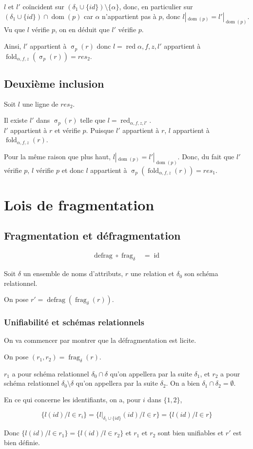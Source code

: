 \documentclass[french]{article}
\DeclareMathOperator{\sel}{\sigma}
\DeclareMathOperator{\frag}{frag}
\DeclareMathOperator{\defrag}{defrag}
\DeclareMathOperator{\id}{id}
\DeclareMathOperator{\dom}{dom}
\DeclareMathOperator{\redu}{red}
\newcommand{\selP}{\sel_p}
\newcommand{\fragDelta}{\frag_{\delta}}
\newcommand{\cip}{\cup \{id\}}
\newcommand{\fold}[3]{\operatorname{fold}_{#1, #2, #3}}
\newcommand{\foldAlphafz}{\fold{\alpha}{f}{z}}
\begin{document}
$l$ et $l'$ coïncident sur $(\delta_1 \cip) \setminus \{ \alpha \}$,
donc, en particulier sur $(\delta_1 \cip) \cap \dom(p)$ car
$\alpha$ n'appartient pas à $p$, donc $l|_{\dom(p)} = l'|_{\dom(p)}$.
Vu que $l$ vérifie $p$, on en déduit que $l'$ vérifie $p$.

Ainsi, $l'$ appartient à $\selP(r)$ donc
$l = \redu{\alpha, f, z, l'}$ appartient
à $\foldAlphafz(\selP(r)) = res_2$.

\subsection*{Deuxième inclusion}
Soit $l$ une ligne de $res_2$.

Il existe $l'$ dans $\selP(r)$ telle que
$l = \redu_{\alpha, f, z, l'}$. \\

$l'$ appartient à $r$ et vérifie $p$.
Puisque $l'$ appartient à $r$,
$l$ appartient à $\foldAlphafz(r)$.

Pour la même raison que plus haut, $l|_{\dom(p)} = l'|_{\dom(p)}$.
Donc, du fait que $l'$ vérifie $p$, $l$ vérifie $p$ et donc
$l$ appartient à $\selP(\foldAlphafz(r)) = res_1$.

\section*{Lois de fragmentation}
\subsection*{Fragmentation et défragmentation}
\begin{align}
\defrag \circ \fragDelta
& = \id
\end{align}

Soit $\delta$ un ensemble de noms d'attributs,
$r$ une relation et $\delta_0$ son schéma relationnel.

On pose $r' = \defrag(\fragDelta(r))$.

\subsubsection*{Unifiabilité et schémas relationnels}
On va commencer par montrer que la défragmentation est licite.

On pose 
$(r_1, r_2) = \fragDelta(r)$.

$r_1$ a pour schéma relationnel
$\delta_0 \cap \delta$ qu'on appellera par la suite $\delta_1$,
et $r_2$ a pour schéma relationnel
$\delta_0\setminus \delta $ qu'on appellera par la suite
$\delta_2$.
On a bien $\delta_1 \cap \delta_2 = \emptyset$. 

En ce qui concerne les identifiants, on a,
pour $i$ dans $\{1, 2\}$, 

$$
\{ l(id) / l \in r_i \}
= \{ l|_{\delta_i \cip}(id) / l \in r\}
= \{l(id) / l \in r \}
$$

Donc $\{ l(id) / l \in r_1 \}
= \{ l(id) / l \in r_2 \}$
et $r_1$ et $r_2$ sont bien
unifiables et $r'$ est bien définie.
\end{document}
